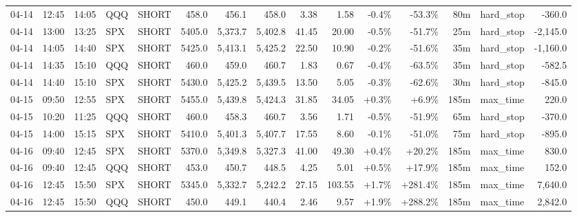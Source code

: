 \documentclass[11pt,a4paper,twoside]{article}
\begin{document}
\begin{landscape}
\begin{center}
\begin{longtable}{>{\color{txtmain}}l l l l l r r r r r r r r >{\color{txtmain}}l r}
04-14 & 12:45 & 14:05 & QQQ & SHORT & 458.0 & 456.1 & 458.0 & 3.38 & 1.58 & \textcolor{lossred}{-0.4\%} & \textcolor{lossred}{-53.3\%} & 80m & hard\_stop & \textcolor{lossred}{-360.0} \\
04-14 & 13:00 & 13:25 & SPX & SHORT & 5405.0 & 5,373.7 & 5,402.8 & 41.45 & 20.00 & \textcolor{lossred}{-0.5\%} & \textcolor{lossred}{-51.7\%} & 25m & hard\_stop & \textcolor{lossred}{-2,145.0} \\
04-14 & 14:05 & 14:40 & SPX & SHORT & 5425.0 & 5,413.1 & 5,425.2 & 22.50 & 10.90 & \textcolor{lossred}{-0.2\%} & \textcolor{lossred}{-51.6\%} & 35m & hard\_stop & \textcolor{lossred}{-1,160.0} \\
04-14 & 14:35 & 15:10 & QQQ & SHORT & 460.0 & 459.0 & 460.7 & 1.83 & 0.67 & \textcolor{lossred}{-0.4\%} & \textcolor{lossred}{-63.5\%} & 35m & hard\_stop & \textcolor{lossred}{-582.5} \\
04-14 & 14:40 & 15:10 & SPX & SHORT & 5430.0 & 5,425.2 & 5,439.5 & 13.50 & 5.05 & \textcolor{lossred}{-0.3\%} & \textcolor{lossred}{-62.6\%} & 30m & hard\_stop & \textcolor{lossred}{-845.0} \\
04-15 & 09:50 & 12:55 & SPX & SHORT & 5455.0 & 5,439.8 & 5,424.3 & 31.85 & 34.05 & \textcolor{wingreen}{+0.3\%} & \textcolor{wingreen}{+6.9\%} & 185m & max\_time & \textcolor{wingreen}{220.0} \\
04-15 & 10:20 & 11:25 & QQQ & SHORT & 460.0 & 458.3 & 460.7 & 3.56 & 1.71 & \textcolor{lossred}{-0.5\%} & \textcolor{lossred}{-51.9\%} & 65m & hard\_stop & \textcolor{lossred}{-370.0} \\
04-15 & 14:00 & 15:15 & SPX & SHORT & 5410.0 & 5,401.3 & 5,407.7 & 17.55 & 8.60 & \textcolor{lossred}{-0.1\%} & \textcolor{lossred}{-51.0\%} & 75m & hard\_stop & \textcolor{lossred}{-895.0} \\
04-16 & 09:40 & 12:45 & SPX & SHORT & 5370.0 & 5,349.8 & 5,327.3 & 41.00 & 49.30 & \textcolor{wingreen}{+0.4\%} & \textcolor{wingreen}{+20.2\%} & 185m & max\_time & \textcolor{wingreen}{830.0} \\
04-16 & 09:40 & 12:45 & QQQ & SHORT & 453.0 & 450.7 & 448.5 & 4.25 & 5.01 & \textcolor{wingreen}{+0.5\%} & \textcolor{wingreen}{+17.9\%} & 185m & max\_time & \textcolor{wingreen}{152.0} \\
04-16 & 12:45 & 15:50 & SPX & SHORT & 5345.0 & 5,332.7 & 5,242.2 & 27.15 & 103.55 & \textcolor{wingreen}{+1.7\%} & \textcolor{wingreen}{+281.4\%} & 185m & max\_time & \textcolor{wingreen}{7,640.0} \\
04-16 & 12:45 & 15:50 & QQQ & SHORT & 450.0 & 449.1 & 440.4 & 2.46 & 9.57 & \textcolor{wingreen}{+1.9\%} & \textcolor{wingreen}{+288.2\%} & 185m & max\_time & \textcolor{wingreen}{2,842.0} \\

\end{longtable}
\end{center}
\end{landscape}
\end{document}
